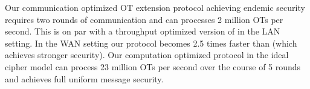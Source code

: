 Our communication optimized OT extension protocol achieving endemic security requires two rounds of communication and can processes 2 million OTs per second. This is on par with a throughput optimized version of \cite{C:KelOrsSch15,libOTe} in the LAN setting. In the WAN setting our protocol becomes 2.5 times faster than \cite{C:KelOrsSch15} (which achieves stronger security). Our computation optimized protocol in the ideal cipher model can process 23 million OTs per second over the course of 5 rounds and achieves full uniform message security.

